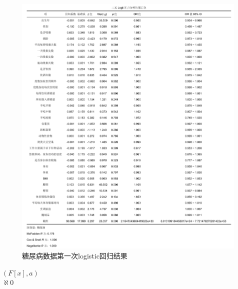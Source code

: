 \documentclass{article}
\numberwithin{equation}{subsection}
\begin{document}
\begin{figure}[H]
    \centering
    \includegraphics[scale=0.78]{logit3.png}
    \caption{糖尿病数据第一次logistic回归结果}
\end{figure}

\newpage
$(F{[x]},a)$ \\
$\aleph 0 $\\
\end{document}
